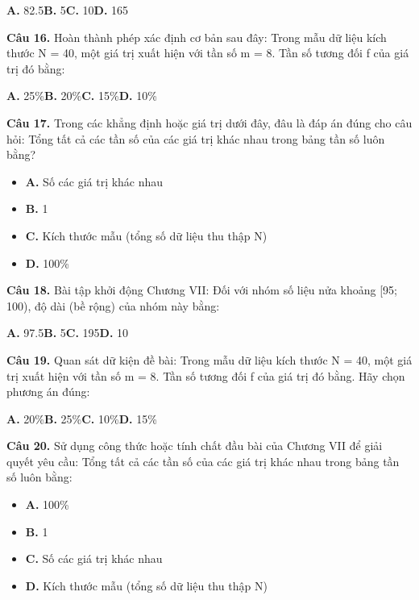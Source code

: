 \documentclass[11pt,a4paper]{article}
\begin{document}
\hspace*{1.5em}\textbf{A.} 82.5\quad\quad \textbf{B.} 5\quad\quad \textbf{C.} 10\quad\quad \textbf{D.} 165\par\vspace{2pt}
\textbf{\color{primary} Câu 16.} Hoàn thành phép xác định cơ bản sau đây: Trong mẫu dữ liệu kích thước N = 40, một giá trị xuất hiện với tần số m = 8. Tần số tương đối f của giá trị đó bằng:\par
\hspace*{1.5em}\textbf{A.} 25\%\quad\quad \textbf{B.} 20\%\quad\quad \textbf{C.} 15\%\quad\quad \textbf{D.} 10\%\par\vspace{2pt}
\textbf{\color{primary} Câu 17.} Trong các khẳng định hoặc giá trị dưới đây, đâu là đáp án đúng cho câu hỏi: Tổng tất cả các tần số của các giá trị khác nhau trong bảng tần số luôn bằng?\par
\begin{itemize}\setlength{\itemsep}{1pt}\setlength{\parskip}{0pt}
  \item[] \textbf{A.} Số các giá trị khác nhau
  \item[] \textbf{B.} 1
  \item[] \textbf{C.} Kích thước mẫu (tổng số dữ liệu thu thập N)
  \item[] \textbf{D.} 100\%
\end{itemize}\vspace{2pt}
\textbf{\color{primary} Câu 18.} Bài tập khởi động Chương VII: Đối với nhóm số liệu nửa khoảng [95; 100), độ dài (bề rộng) của nhóm này bằng:\par
\hspace*{1.5em}\textbf{A.} 97.5\quad\quad \textbf{B.} 5\quad\quad \textbf{C.} 195\quad\quad \textbf{D.} 10\par\vspace{2pt}
\textbf{\color{primary} Câu 19.} Quan sát dữ kiện đề bài: Trong mẫu dữ liệu kích thước N = 40, một giá trị xuất hiện với tần số m = 8. Tần số tương đối f của giá trị đó bằng. Hãy chọn phương án đúng:\par
\hspace*{1.5em}\textbf{A.} 20\%\quad\quad \textbf{B.} 25\%\quad\quad \textbf{C.} 10\%\quad\quad \textbf{D.} 15\%\par\vspace{2pt}
\textbf{\color{primary} Câu 20.} Sử dụng công thức hoặc tính chất đầu bài của Chương VII để giải quyết yêu cầu: Tổng tất cả các tần số của các giá trị khác nhau trong bảng tần số luôn bằng:\par
\begin{itemize}\setlength{\itemsep}{1pt}\setlength{\parskip}{0pt}
  \item[] \textbf{A.} 100\%
  \item[] \textbf{B.} 1
  \item[] \textbf{C.} Số các giá trị khác nhau
  \item[] \textbf{D.} Kích thước mẫu (tổng số dữ liệu thu thập N)
\end{itemize}\vspace{2pt}
\end{document}

